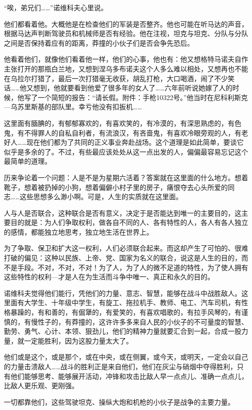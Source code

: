 “唉，弟兄们……”诺维科夫心里说。

他们都看着他。大概他是在检查他们的军装是否整齐。他也可能在听马达的声音，根据马达声判断驾驶员和机械师是否有经验。他在注视，坦克与坦克、分队与分队之间是否保持着应有的距离，莽撞的小伙子们是否会争先恐后。

他看着他们，就像他们看着他一样，他们的心事，他也有：他又想格特马诺夫自作主张打开的那瓶白兰地，又想到涅乌多布诺夫这个人多么难以相处，又想再也不能在乌拉尔打猎了，最后一次打猎毫无收获，胡乱打枪，大口喝酒，闹了不少笑话……他又想到，他就要看到他爱了很多年的女人了……六年前听说她嫁了人的时候，他写了一个简短的报告：“请长假。附件：手枪10322号。”他当时在尼科利斯克—乌苏里斯基的部队里。幸亏他没有扣扳机……

这里面有腼腆的，有郁郁寡欢的，有喜欢笑的，有冷漠的，有深思熟虑的，有色鬼，有不得罪人的自私自利者，有流浪汉，有吝啬鬼，有喜欢冷眼旁观的人，有老好人……现在他们都为了共同的正义事业奔赴战场。这个道理是如此简单，要谈它似乎是多余的了。不过，有些最应该处处从这一点出发的人，偏偏最容易忘记这个最简单的道理。

历来争论着一个问题：人是不是为星期六活着？答案就在这里面的什么地方。想着靴子，想着被扔掉的小狗，想着偏僻小村子里的房子，痛恨夺去心头所爱的同志……这些思想多么渺小啊。可是，人生的实质就在这里面。

人与人是否联合，这种联合是否有意义，决定于是否能达到唯一的主要目的，这主要目的就是：为人们争取权利，做各自不同的人、各有特性的人，各人有各人独立的感情，都能独立地思考，独立地生活在世界上。

为了争取、保卫和扩大这一权利，人们必须联合起来。而这却产生了可怕的、很难打破的偏见：这种以民族、上帝、党、国家为名义的联合，说这是人生的目的，而不是手段。不对，不对，不对！为了人，为了人的微不足道的特性，为了使人拥有这些特性的权利—才是人在为生活而斗争中唯一、真正和永久的目的。

诺维科夫觉得他们能行，凭他们的力量、意志、智慧，能够在战斗中战胜敌人。这里面有大学生、十年级中学生，有旋工、拖拉机手、教师、电工、汽车司机，有性格暴躁的，有和善的，有倔犟的，有爱笑的，有喜欢唱歌的，有拉手风琴的，有谨慎的，有慢性子的，有莽撞的，这许许多多来自人民的小伙子的不可量度的智慧、勤劳、勇气、心计、本领、狠劲儿，他们的精神力量就要汇合到一起，合成一股力量，就一定能胜利，因为这股力量太大了。

他们或是这个，或是那个，或在中央，或在侧翼，或今天，或明天，一定会以自己的力量击溃敌人……战斗的胜利正是来自他们，他们在灰尘与硝烟中夺得胜利，只有他们能够思考、能够展开活动，冲锋和攻击比敌人早一点点儿、准确一点点儿，比敌人更乐观、更刚强。

一切都靠他们，这些驾驶坦克、操纵大炮和机枪的小伙子是战争的主要力量。

